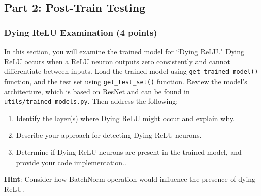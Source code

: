 \documentclass[11pt, oneside]{article}   	%
\begin{document}
\subsection*{Part 2: Post-Train Testing}

\subsubsection*{Dying ReLU Examination (4 points)}
In this section, you will examine the trained model for ``Dying ReLU." \href{https://datascience.stackexchange.com/questions/5706/what-is-the-dying-relu-problem-in-neural-networks}{Dying ReLU} occurs when a ReLU neuron outputs zero consistently and cannot differentiate between inputs. 
Load the trained model using \texttt{get\_trained\_model()} function, and the test set using \texttt{get\_test\_set()} function. Review the model's architecture, which is based on ResNet and can be found in \texttt{utils/trained\_models.py}. Then address the following:


\begin{enumerate}
    \item Identify the layer(s) where Dying ReLU might occur and explain why.
    \item Describe your approach for detecting Dying ReLU neurons. 
    \item Determine if Dying ReLU neurons are present in the trained model, and provide your code implementation..
\end{enumerate}
\textbf{Hint}: Consider how BatchNorm operation would influence the presence of dying ReLU.
    
\end{document}
